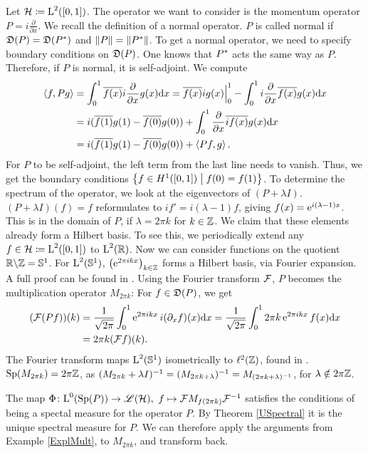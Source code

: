 \begin{expl}
 
 Let $\mathcal{H} \coloneqq \text{L}^2(\left[ 0, 1 \right])$. 
 The operator we want to consider is the momentum operator 
 $P = i \frac{\partial}{\partial x}$.
 We recall the definition of a normal operator.
 $P$ is called normal if $\mathfrak{D}(P) = \mathfrak{D}(P^{*})$ and 
 $\|P\| = \| P ^{*} \|$. To get a normal operator, we
 need to specify boundary conditions on $\mathfrak{D}(P)$. One knows that
 $P^{*}$ acts the same way as $P$. Therefore, if $P$ is normal,
 it is self-adjoint.
 We compute
 \begin{align*}
  \left\langle f, Pg \right\rangle 
 & =\int _0 ^1 \overline{f(x)} i \frac{\partial}{\partial x}g(x) \text{d}x
  = \overline{f(x)}ig(x)\Bigr|^{1}_{0}
  -\int _0 ^1 i \frac{\partial}{\partial x}\overline{f(x)} g(x) \text{d}x\\
&= i(\overline{f(1)}g(1)- \overline{f(0)}g(0))
+ \int _0 ^1 \frac{\partial}{\partial x}\overline{i f(x)} g(x) \text{d}x\\
&=i(\overline{f(1)}g(1)- \overline{f(0)}g(0)) 
+\left\langle Pf, g \right\rangle.
 \end{align*}
For $P$ to be self-adjoint, the left term from the last line needs 
to vanish. Thus, we get the boundary conditions 
 $\left\lbrace f \in H^1(\left[ 0,1 \right]) \bigm| f(0) = f(1) \right\rbrace$.
 To determine the spectrum of the operator, we look at 
 the eigenvectors of $(P+\lambda I)$.
 $(P+\lambda I)(f)=f$ reformulates to $i f' = i(\lambda - 1)f$, giving
 $f(x)= \operatorname{e}^{i(\lambda -1 )x}$. This is in the domain of $P$, if 
 $\lambda = 2\pi k$ for $k \in \mathbb{Z}$. We claim that these elements
 already form a Hilbert basis. To see this, we periodically
 extend any
 $f \in \mathcal{H} \coloneqq \text{L}^2(\left[ 0, 1 \right])$ to 
 $\text{L}^2(\mathbb{R})$. Now we can consider functions on the quotient 
 $\mathbb{R} \backslash \mathbb{Z} = \mathbb{S}^1$. For $\text{L}^2(\mathbb{S}^1)$,
 $\left(\operatorname{e}^{2\pi i k x }\right)_{k \in \mathbb{Z}}$ forms a Hilbert basis, via
 Fourier expansion. A full proof can be found in 
 \cite[Ch. V.4]{WernerFunkAna}.
 Using the Fourier transform $\mathcal{F}$, $P$ becomes the multiplication operator
 $M_{2 \pi k}$: For $f \in \mathfrak{D}(P)$, we get
 \begin{align*}
  (\mathcal{F}(Pf))(k)
  &= \frac{1}{\sqrt{2\pi}} \int _0 ^1 \operatorname{e}^{2\pi i k x}i(\partial_xf)(x)\text{d}x
  = \frac{1}{\sqrt{2\pi}} \int _0 ^1 2 \pi k \operatorname{e}^{2\pi i k x}f(x)\text{d}x \\
  &= 2 \pi k (\mathcal{F}f)(k).
 \end{align*}
The Fourier transform maps $\text{L}^2(\mathbb{S}^1)$ isometrically
to $\ell^2(\mathbb{Z})$, found in \cite[p. 205]{TaylorPDEI}. $\operatorname{Sp}(M_{2\pi k}) = 2\pi \mathbb{Z}$, as 
$(M_{2 \pi k } + \lambda I)^{-1} = (M_{2 \pi k + \lambda})^{-1}
= M_{(2 \pi k + \lambda)^{-1}}$, for $\lambda \notin 2\pi \mathbb{Z}$.

The map $\Phi \colon \text{L}^0(\operatorname{Sp}(P)) \to \mathscr{L}(\mathcal{H}), ~
f \mapsto \mathcal{F}M_{f(2\pi k)} \mathcal{F}^{-1}$ satisfies the conditions
of being a spectal measure for the operator $P$. By Theorem \ref{USpectral}
it is the unique spectral measure for $P$. 
We can therefore apply the arguments from Example
\ref{ExplMult}, to $M_{2 \pi k}$, and transform back.

\end{expl}

